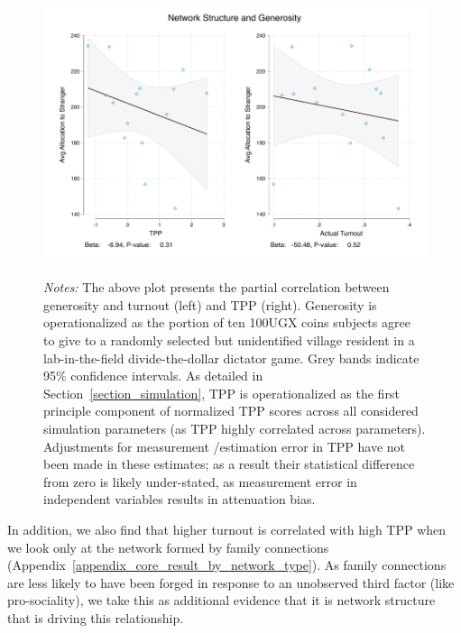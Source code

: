 \documentclass[12pt]{article}
\begin{document}
\begin{figure}[!h]
	\begin{center}
	    \caption{}\label{figure_generosity}
    		\includegraphics[width=\textwidth]{../3_results/games_and_network.pdf}
    \end{center}
	\scriptsize{\emph{Notes:}  The above plot presents the partial correlation between generosity and turnout (left) and TPP (right). Generosity is operationalized as the portion of ten 100UGX coins subjects agree to give to a randomly selected but unidentified village resident in a lab-in-the-field divide-the-dollar dictator game.  Grey bands indicate 95\% confidence intervals. As detailed in Section~\ref{section_simulation}, TPP is operationalized as the first principle component of normalized TPP scores across all considered simulation parameters (as TPP highly correlated across parameters). Adjustments for measurement /estimation error in TPP have not been made in these estimates; as a result their statistical difference from zero is likely under-stated, as measurement error in independent variables results in attenuation bias.}
\end{figure}


In addition, we also find that higher turnout is correlated with high TPP when we look only at the network formed by family connections (Appendix~\ref{appendix_core_result_by_network_type}). As family connections are less likely to have been forged in response to an unobserved third factor (like pro-sociality), we take this as additional evidence that it is network structure that is driving this relationship.
\end{document}
